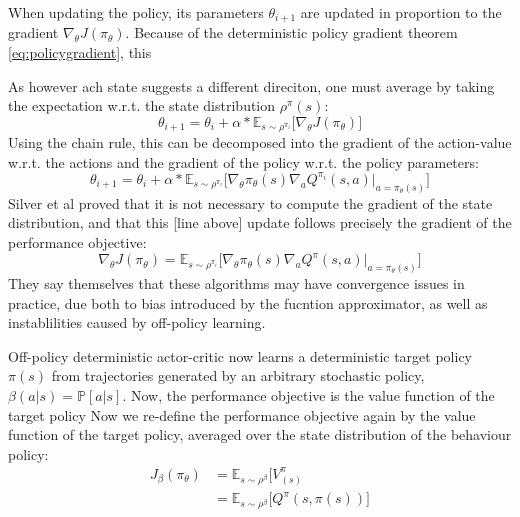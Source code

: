 When updating the policy, its parameters $\theta_{i+1}$ are updated in proportion to the gradient $\nabla_{\theta}J(\pi_\theta)$. Because of the deterministic policy gradient theorem \ref{eq:policygradient}, this

As however ach state suggests a different direciton, one must average by taking the expectation w.r.t. the state distribution $\rho^\pi(s)$: 
\begin{equation}
	\theta_{i+1} = \theta_i + \alpha * \mathds{E}_{s\sim\rho^{\pi_i}} \big[ \nabla_{\theta}J(\pi_\theta) \big]
\end{equation}
Using the chain rule, this can be decomposed into the gradient of the action-value w.r.t. the actions and the gradient of the policy w.r.t. the policy parameters:
\begin{equation}
	\theta_{i+1} = \theta_i + \alpha * \mathds{E}_{s\sim\rho^{\pi_i}} \big[ \nabla_{\theta} \pi_\theta(s) \nabla_a Q^{\pi_i}(s,a) \Big|_{a=\pi_\theta(s)} \big]
\end{equation}
Silver et al \cite{silver_deterministic_2014} proved that it is not necessary to compute the gradient of the state distribution, and that this [line above] update follows precisely the gradient of the performance objective:
\begin{equation}
	\nabla_{\theta}J(\pi_\theta) = \mathds{E}_{s\sim\rho^{\pi_i}} \big[ \nabla_{\theta} \pi_\theta(s) \nabla_a Q^\pi(s,a) \Big|_{a=\pi_\theta(s)} \big]
\end{equation} 
They say themselves that these algorithms may have convergence issues in practice, due both to bias introduced by the fucntion approximator, as well as instablilities caused by off-policy learning.

Off-policy deterministic actor-critic now learns a deterministic target policy $\pi(s)$ from trajectories generated by an arbitrary stochastic policy, $\beta(a|s) = \mathds{P}[a|s]$.
Now, the performance objective is the value function of the target policy %
Now we re-define the performance objective again by the value function of the target policy, averaged over the state distribution of the behaviour policy: 
\begin{align}
	J_\beta(\pi_\theta) &= \mathds{E}_{s\sim\rho^\beta} \big[ V^\pi_(s)\\
	  &= \mathds{E}_{s\sim\rho^\beta} \big[ Q^\pi(s,\pi(s)) \big]
\end{align}

